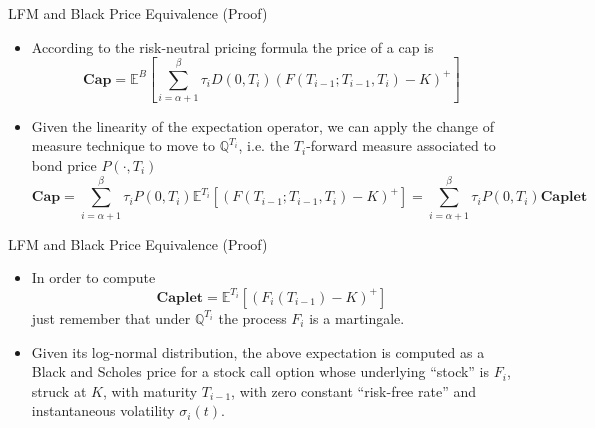 \documentclass{beamer}
\begin{document}
\begin{frame}{LFM and Black Price Equivalence (Proof)}
	\begin{itemize}
	\item<1-> According to the risk-neutral pricing formula the price of a cap is
	\begin{equation*}
		\textbf{Cap}=\mathbb{E}^B\left[\sum_{i=\alpha+1}^\beta 	\tau_iD(0, T_i)(F(T_{i-1}; T_{i-1}, T_i) - K)^+\right]
	\end{equation*}
	\item<2-> Given the linearity of the expectation operator, we can apply the change of measure technique to move to $\mathbb{Q}^{T_i}$, i.e. the $T_i$-forward measure associated to bond price $P(\cdot,T_i)$
	\begin{equation*}
		\textbf{Cap}= \sum_{i=\alpha+1}^\beta \tau_i P(0, T_i)\mathbb{E}^{T_i}[(F(T_{i-1}; T_{i-1}, T_i) - K)^+] = \sum_{i=\alpha+1}^\beta \tau_i P(0, T_i)\textbf{Caplet}
	\end{equation*}
	\end{itemize}
\end{frame}

\begin{frame}{LFM and Black Price Equivalence (Proof)}
	\begin{itemize}
	\item In order to compute
	\begin{equation*}
		\textbf{Caplet} = \mathbb{E}^{T_i}[(F_i(T_{i-1}) - K)^+]
	\end{equation*}
	just remember that under $\mathbb{Q}^{T_i}$ the process $F_i$ is a martingale.
	\item Given its log-normal distribution, the above expectation is computed as \textcolor{maincolor}{a Black and Scholes price for a stock call option whose underlying “stock” is $F_i$, struck at $K$, with maturity $T_{i-1}$, with zero constant “risk-free rate” and instantaneous volatility $\sigma_i(t)$.}
\end{itemize}
\end{frame}
\end{document}
